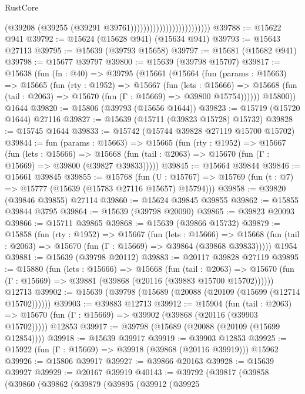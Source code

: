 \begin{lexlean}{RustCore}
\begin{coremodule}
                                                (@39208
                                                  (@39255 (@39291 @39761)))))))))))))))))))))))))
@39788 := @15622 @941
@39792 := @15624 (@15628 @941) (@15634 @941)
@39793 := @15643 @27113
@39795 := @15639 (@39793 @15658)
@39797 := @15681 (@15682 @941)
@39798 := @15677 @39797
@39800 := @15639 (@39798 @15707)
@39817 := @15638
    (fun (fn : @40) =>
    @39795
      (@15661
        (@15664
          (fun (params : @15663) =>
          @15665
            (fun (rty : @1952) =>
            @15667
              (fun (lets : @15666) =>
              @15668 (fun (tail : @2063) => @15670 (fun (Γ : @15669) => @39800 @15754))))))
        @15800))
    @1644
@39820 := @15806 (@39793 (@15656 @1644))
@39823 := @15719 (@15720 @1644) @27116
@39827 := @15639 (@15711 (@39823 @15728) @15732)
@39828 := @15745 @1644
@39833 := @15742 (@15744 @39828 @27119 @15700 @15702)
@39844 := fun (params : @15663) =>
  @15665
    (fun (rty : @1952) =>
    @15667
      (fun (lets : @15666) =>
      @15668 (fun (tail : @2063) => @15670 (fun (Γ : @15669) => @39800 (@39827 @39833)))))
@39845 := @15664 @39844
@39846 := @15661 @39845
@39855 := @15768
    (fun (U : @15767) => @15769 (fun (t : @7) => @15777 (@15639 (@15783 @27116 @15657) @15794)))
@39858 := @39820 (@39846 @39855) @27114
@39860 := @15624 @39845 @39855
@39862 := @15855 @39844 @3795
@39864 := @15639 (@39798 @20090)
@39865 := @39823 @20093
@39866 := @15711 @39865
@39868 := @15639 (@39866 @15732)
@39879 := @15858
    (fun (rty : @1952) =>
    @15667
      (fun (lets : @15666) =>
      @15668 (fun (tail : @2063) => @15670 (fun (Γ : @15669) => @39864 (@39868 @39833)))))
    @1954
@39881 := @15639 (@39798 @20112)
@39883 := @20117 @39828 @27119
@39895 := @15880
    (fun (lets : @15666) =>
    @15668
      (fun (tail : @2063) =>
      @15670 (fun (Γ : @15669) => @39881 (@39868 (@20116 (@39883 @15700 @15702))))))
    @12713
@39902 := @15639 (@39798 (@15689 (@20088 (@20109 (@15699 (@12714 @15702))))))
@39903 := @39883 @12713
@39912 := @15904
    (fun (tail : @2063) => @15670 (fun (Γ : @15669) => @39902 (@39868 (@20116 (@39903 @15702)))))
    @12853
@39917 := @39798 (@15689 (@20088 (@20109 (@15699 @12854))))
@39918 := @15639 @39917
@39919 := @39903 @12853
@39925 := @15922 (fun (Γ : @15669) => @39918 (@39868 (@20116 @39919))) @15962
@39926 := @15806 @39917
@39927 := @39866 @20163
@39928 := @15639 @39927
@39929 := @20167 @39919
@40143 := @39792
    (@39817
      (@39858
        (@39860
          (@39862
            (@39879
              (@39895
                (@39912
                  (@39925

\end{coremodule}
\end{lexlean}
